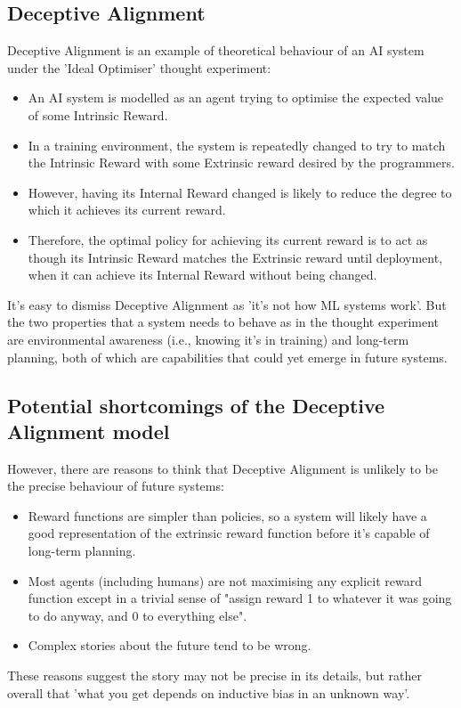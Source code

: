 \documentclass{article}
\begin{document}
\begin{multicols}{2}
\subsection*{Deceptive Alignment}
Deceptive Alignment is an example of theoretical behaviour of an AI system under the 'Ideal Optimiser' thought experiment:
\begin{itemize}
    \item An AI system is modelled as an agent trying to optimise the expected value of some Intrinsic Reward.
    \item In a training environment, the system is repeatedly changed to try to match the Intrinsic Reward with some Extrinsic reward desired by the programmers.
    \item However, having its Internal Reward changed is likely to reduce the degree to which it achieves its current reward.
    \item Therefore, the optimal policy for achieving its current reward is to act as though its Intrinsic Reward matches the Extrinsic reward until deployment, when it can achieve its Internal Reward without being changed.
\end{itemize}
It's easy to dismiss Deceptive Alignment as 'it's not how ML systems work'. But the two properties that a system needs to behave as in the thought experiment are environmental awareness (i.e., knowing it's in training) and long-term planning, both of which are capabilities that could yet emerge in future systems.

\subsection*{Potential shortcomings of the Deceptive Alignment model}
However, there are reasons to think that Deceptive Alignment is unlikely to be the precise behaviour of future systems:
\begin{itemize}
    \item Reward functions are simpler than policies, so a system will likely have a good representation of the extrinsic reward function before it's capable of long-term planning.
    \item Most agents (including humans) are not maximising any explicit reward function except in a trivial sense of "assign reward 1 to whatever it was going to do anyway, and 0 to everything else".
    \item Complex stories about the future tend to be wrong.
\end{itemize}
These reasons suggest the story may not be precise in its details, but rather overall that 'what you get depends on inductive bias in an unknown way'.


\end{multicols}
\end{document}
